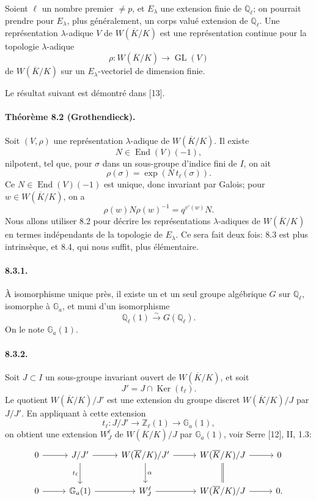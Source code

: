 \documentclass[10pt]{article}
\newcommand{\GL}{\operatorname{GL}}
\newcommand{\iso}{\xrightarrow{\sim}}
\providecommand{\Ker}{\operatorname{Ker}}
\providecommand{\GL}{\operatorname{GL}}
\providecommand{\End}{\operatorname{End}}
\providecommand{\GL}{\operatorname{GL}}
\providecommand{\End}{\operatorname{End}}
\providecommand{\Ker}{\operatorname{Ker}}
\begin{document}
Soient \(\ell\) un nombre premier \(\ne p\), et \(E_\lambda\) une extension finie de \(\mathbb Q_\ell\); on pourrait prendre pour \(E_\lambda\), plus généralement, un corps valué extension de \(\mathbb Q_\ell\). Une représentation \(\lambda\)-adique \(V\) de \(W(\overline K/K)\) est une représentation continue pour la topologie \(\lambda\)-adique
\[
\rho:W(\overline K/K)\longrightarrow\GL(V)
\]
de \(W(\overline K/K)\) sur un \(E_\lambda\)-vectoriel de dimension finie.

Le résultat suivant est démontré dans [13].

\paragraph{Théorème 8.2 (Grothendieck).} Soit \((V,\rho)\) une représentation \(\lambda\)-adique de \(W(\overline K/K)\). Il existe
\[
N\in\End(V)(-1),
\]
nilpotent, tel que, pour \(\sigma\) dans un sous-groupe d'indice fini de \(I\), on ait
\[
\rho(\sigma)=\exp(N\,t_\ell(\sigma)).
\]
Ce \(N\in\End(V)(-1)\) est unique, donc invariant par Galois; pour \(w\in W(\overline K/K)\), on a
\[
\rho(w)N\rho(w)^{-1}=q^{v'(w)}N.
\]
Nous allons utiliser 8.2 pour décrire les représentations \(\lambda\)-adiques de \(W(\overline K/K)\) en termes indépendants de la topologie de \(E_\lambda\). Ce sera fait deux fois: 8.3 est plus intrinsèque, et 8.4, qui nous suffit, plus élémentaire.

\paragraph{8.3.1.} À isomorphisme unique près, il existe un et un seul groupe algébrique \(G\) sur \(\mathbb Q_\ell\), isomorphe à \(\mathbb G_a\), et muni d'un isomorphisme
\[
\mathbb Q_\ell(1)\iso G(\mathbb Q_\ell).
\]
On le note \(\mathbb G_a(1)\).

\paragraph{8.3.2.} Soit \(J\subset I\) un sous-groupe invariant ouvert de \(W(\overline K/K)\), et soit
\[
J'=J\cap\Ker(t_\ell).
\]
Le quotient \(W(\overline K/K)/J'\) est une extension du groupe discret \(W(\overline K/K)/J\) par \(J/J'\). En appliquant à cette extension
\[
t_\ell:J/J'\longrightarrow\mathbb Z_\ell(1)\longrightarrow\mathbb G_a(1),
\]
on obtient une extension \(W_J^\ell\) de \(W(\overline K/K)/J\) par \(\mathbb G_a(1)\), voir Serre [12], II, 1.3:
\[
\begin{tikzcd}[column sep=2.7em,row sep=2.3em]
0 \arrow[r] & J/J' \arrow[r] \arrow[d,"t_\ell"'] &
W(\overline K/K)/J' \arrow[r] \arrow[d,"\alpha"] &
W(\overline K/K)/J \arrow[r] \arrow[d,equal] & 0\\
0 \arrow[r] & \mathbb G_a(1) \arrow[r] &
W_J^\ell \arrow[r] &
W(\overline K/K)/J \arrow[r] & 0 .
\end{tikzcd}
\]
\end{document}
